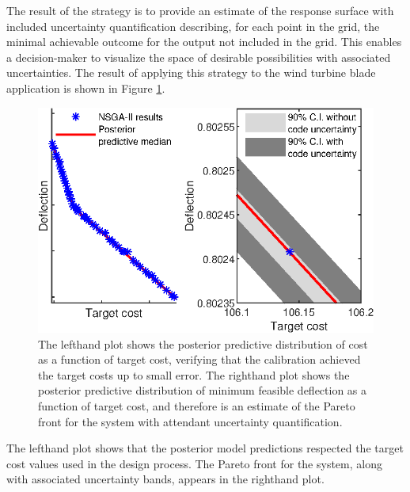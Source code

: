 \documentclass[12pt]{article}
\begin{document}
The result of the strategy is to provide an estimate of the response surface with included uncertainty quantification describing, for each point in the grid, the minimal achievable outcome for the output not included in the grid.
%
This enables a decision-maker to visualize the space of desirable possibilities with associated uncertainties. 
%
%
The result of applying this strategy to the wind turbine blade application is shown in Figure \ref{fig:known_cost}. 
%
\begin{figure}[h]
\centering
\includegraphics[scale=.8]{FIG_cost_grid_pareto_bands.eps}
\caption{The lefthand plot shows the posterior predictive distribution of cost as a function of target cost, verifying that the calibration achieved the target costs up to small error. The righthand plot shows the posterior predictive distribution of minimum feasible deflection as a function of target cost, and therefore is an estimate of the Pareto front for the system with attendant uncertainty quantification.}
\label{fig:known_cost}
\end{figure}
%
The lefthand plot shows that the posterior model predictions respected the target cost values used in the design process.
%
The Pareto front for the system, along with associated uncertainty bands, appears in the righthand plot.
%
%
%
\end{document}
